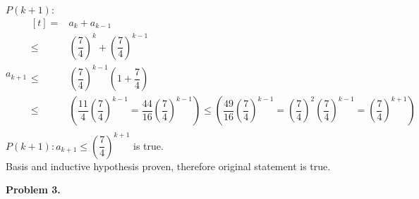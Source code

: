 \documentclass[letterpaper,fleqn,leqno]{article}
\begin{document}
\begin{enumerate}[(a)]
{			$P(k+1):$ \\
			$a_{k+1}\begin{aligned}[t]
				=  & a_k+a_{k-1} \\
				\leq & \left(\dfrac{7}{4}\right)^k+\left(\dfrac{7}{4}\right)^{k-1} \\
				\leq & \left(\dfrac{7}{4}\right)^{k-1}\left(1+\dfrac{7}{4}\right) \\
				\leq & \left(\dfrac{11}{4}\left(\dfrac{7}{4}\right)^{k-1}=\dfrac{44}{16}\left(\dfrac{7}{4}\right)^{k-1}\right)\leq\left(\dfrac{49}{16}\left(\dfrac{7}{4}\right)^{k-1}=\left(\dfrac{7}{4}\right)^2\left(\dfrac{7}{4}\right)^{k-1}=\left(\dfrac{7}{4}\right)^{k+1}\right) \\
			\end{aligned}$ \\
			$P(k+1):a_{k+1}\leq\left(\dfrac{7}{4}\right)^{k+1}$ is true. \\
			Basis and inductive hypothesis proven, therefore original statement is true. \\
		}
	\end{enumerate}
	
	\noindent \textbf{Problem 3.}
	\begin{enumerate}[(a)]
	\end{enumerate}
\end{document}
